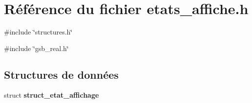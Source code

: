 \section{Référence du fichier etats\_\-affiche.h}
\label{etats__affiche_8h}
{\ttfamily \#include \char`\"{}structures.h\char`\"{}}\par
{\ttfamily \#include \char`\"{}gsb\_\-real.h\char`\"{}}\par
\subsection*{Structures de données}
\begin{DoxyCompactItemize}
\item 
struct {\bf struct\_\-etat\_\-affichage}
\end{DoxyCompactItemize}
